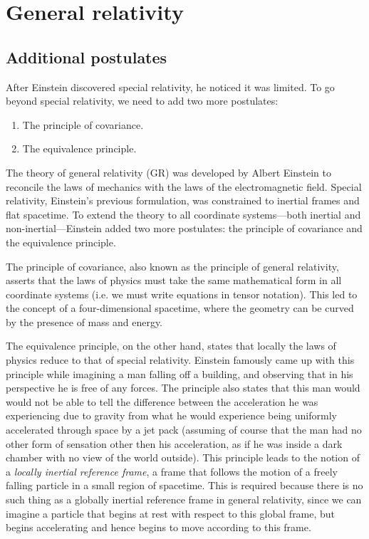 \section{General relativity}

\subsection{Additional postulates}

After Einstein discovered special relativity, he noticed it was limited. To go beyond special relativity, we need to add two more postulates:

\begin{enumerate}
    \item The principle of covariance.
    \item The equivalence principle.
\end{enumerate}

The theory of general relativity (GR) was developed by Albert Einstein to reconcile the laws of mechanics with the laws of the electromagnetic field. Special relativity, Einstein's previous formulation, was constrained to inertial frames and flat spacetime. To extend the theory to all coordinate systems—both inertial and non-inertial—Einstein added two more postulates: the principle of covariance and the equivalence principle.

The principle of covariance, also known as the principle of general relativity, asserts that the laws of physics must take the same mathematical form in all coordinate systems (i.e. we must write equations in tensor notation). This led to the concept of a four-dimensional spacetime, where the geometry can be curved by the presence of mass and energy.

The equivalence principle, on the other hand, states that locally the laws of physics reduce to that of special relativity.  Einstein famously came up with this principle while imagining a man falling off a building, and observing that in his perspective he is free of any forces. The principle also states that this man would would not be able to tell the difference between the acceleration he was experiencing due to gravity from what he would experience being uniformly accelerated through space by a jet pack (assuming of course that the man had no other form of sensation other then his acceleration, as if he was inside a dark chamber with no view of the world outside). This principle leads to the notion of a \textit{locally inertial reference frame}, a frame that follows the motion of a freely falling particle in a small region of spacetime. This is required because there is no such thing as a globally inertial reference frame in general relativity, since we can imagine a particle that begins at rest with respect to this global frame, but begins accelerating and hence begins to move according to this frame.

